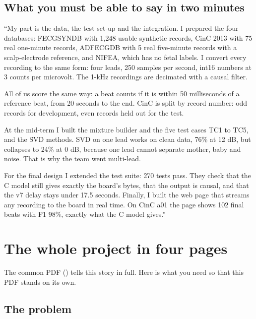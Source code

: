 \documentclass[11pt]{article}
\renewcommand{\file}[1]{\path{#1}}
\begin{document}
\subsection{What you must be able to say in two minutes}

\begin{lesson}
``My part is the data, the test set-up and the integration. I prepared the four databases: FECGSYNDB with 1,248 usable synthetic records, CinC 2013 with 75 real one-minute records, ADFECGDB with 5 real five-minute records with a scalp-electrode reference, and NIFEA, which has no fetal labels. I convert every recording to the same form: four leads, 250 samples per second, int16 numbers at 3 counts per microvolt. The 1-kHz recordings are decimated with a causal filter.

All of us score the same way: a beat counts if it is within 50 milliseconds of a reference beat, from 20 seconds to the end. CinC is split by record number: odd records for development, even records held out for the test.

At the mid-term I built the mixture builder and the five test cases TC1 to TC5, and the SVD methods. SVD on one lead works on clean data, 76\% at 12 dB, but collapses to 24\% at 0 dB, because one lead cannot separate mother, baby and noise. That is why the team went multi-lead.

For the final design I extended the test suite: 270 tests pass. They check that the C model still gives exactly the board's bytes, that the output is causal, and that the v7 delay stays under 17.5 seconds. Finally, I built the web page that streams any recording to the board in real time. On CinC a01 the page shows 102 final beats with F1 98\%, exactly what the C model gives.''
\end{lesson}

\section{The whole project in four pages}

The common PDF (\file{00_Project_Explained_From_Zero.pdf}) tells this story in full. Here is what you need so that this PDF stands on its own.

\subsection{The problem}
\end{document}
